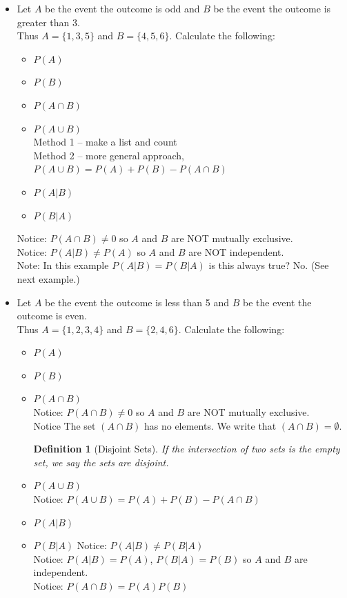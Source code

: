 \documentclass{article}
\theoremstyle{plain}
\theoremstyle{box}
\newtheorem*{definition*}{Definition}
\begin{document}
\begin{itemize}
\item Let $A$ be the event the outcome is odd and $B$ be the event the outcome is greater than 3.\\
Thus $A = \{1,3,5\}$ and $B = \{4,5,6\}$. Calculate the following:
\begin{itemize}
\item $P(A)$
\item $P(B)$
\item $P(A \cap B)$
\item $P(A \cup B)$\\
Method 1 -- make a list and count\\
Method 2 -- more general approach, $P(A \cup B) = P(A) + P(B) - P(A \cap B)$
\item $P(A|B)$
\item $P(B|A)$
\end{itemize}
Notice: $P(A \cap B) \neq  0$ so $A$ and $B$ are NOT mutually exclusive.\\
Notice: $P(A|B) \neq P(A)$ so $A$ and $B$ are NOT independent.\\
Note: In this example $P(A|B) = P(B|A)$ is this always true? No. (See next example.)

\item Let $A$ be the event the outcome is less than 5 and $B$ be the event the outcome is even.\\
Thus $A = \{1,2,3,4\}$ and $B = \{2,4,6\}$. Calculate the following:
\begin{itemize}
\item $P(A)$
\item $P(B)$
\item $P(A \cap B)$\\
Notice: $P(A \cap B) \neq 0$ so $A$ and $B$ are NOT mutually exclusive.\\
Notice The set $(A \cap B)$ has no elements. We write that $(A \cap B) = \emptyset$.\\
\begin{definition*}[Disjoint Sets]
If the intersection of two sets is the empty set, we say the sets are disjoint.
\end{definition*}
\item $P(A \cup B)$\\
Notice: $P(A \cup B) = P(A) + P(B) - P(A \cap B)$
\item $P(A|B)$
\item $P(B|A)$
Notice: $P(A|B) \neq P(B|A)$\\
Notice: $P(A|B) = P(A)$, $P(B|A) = P(B)$ so $A$ and $B$ are independent.\\
Notice: $P(A \cap B) = P(A)P(B)$
\end{itemize}


\end{itemize}
\end{document}

